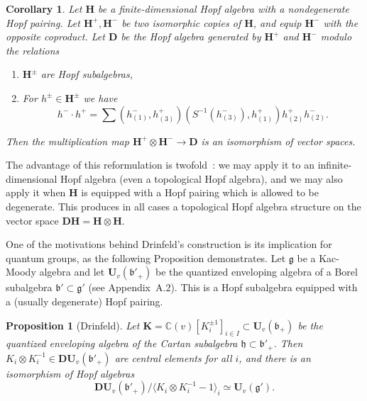 \documentclass[a4paper,10pt]{amsart}
\def\H{\mathbf{H}}
\def\U{\mathbf{U}}
\def\C{\mathbb{C}}
\def\g{\mathfrak{g}}
\def\bo{\mathfrak{b}}
\def\h{\mathfrak{h}}
\newtheorem{cor}[theo]{Corollary}
\newtheorem{prop}[theo]{Proposition}
\numberwithin{equation}{section}
\begin{document}
{\vspace{.1in}

\begin{cor}\label{C:Dridri} Let $\H$ be a finite-dimensional Hopf algebra with a nondegenerate Hopf pairing. Let $\H^+, \H^-$ be two isomorphic copies of $\H$, and equip $\H^-$ with the opposite coproduct. Let $\mathbf{D}$ be the Hopf algebra generated by $\H^+$ and $\H^-$ modulo the relations
\begin{enumerate}
\item[i)] $\H^{\pm}$ are Hopf subalgebras,
 \item[ii)] For $h^\pm \in \H^{\pm}$ we have
 $$h^- \cdot h^+=\sum  (h^-_{(1)},h^+_{(3)})(S^{-1}(h^-_{(3)}),h^+_{(1)})h^+_{(2)}h^-_{(2)}.$$
\end{enumerate}
Then the multiplication map $\H^+ \otimes \H^- \to \mathbf{D}$ is an isomorphism of vector spaces.
\end{cor}

\vspace{.1in}

The advantage of this reformulation is twofold~: we may apply it to an infinite-dimensional Hopf algebra (even a topological Hopf algebra), and we may also apply it when $\H$ is equipped with a Hopf pairing which is allowed to be degenerate. This produces in all cases a topological Hopf algebra structure on the vector space $\mathbf{D}\H=\H \otimes \H$.

\vspace{.15in}

One of the motivations behind Drinfeld's construction is its implication for quantum groups, as the following Proposition demonstrates. Let $\g$ be a Kac-Moody algebra and let $\U_v(\bo'_+)$ be the quantized enveloping algebra of a Borel subalgebra $\bo' \subset \g'$ (see Appendix~A.2). This is a Hopf subalgebra equipped with a (usually degenerate) Hopf pairing.

\vspace{.1in}

\begin{prop}[Drinfeld]  Let $\mathbf{K}=\C(v)[K_i^{\pm 1}]_{i \in I} \subset \U_v(\bo_+)$ be the quantized enveloping algebra of the Cartan subalgebra $\h \subset \bo'_+$.
Then $K_i \otimes K_i^{-1} \in \mathbf{D}\U_v(\bo'_+)$ are central elements for all $i$, and there is an isomorphism of Hopf algebras
$$\mathbf{D}\U_v(\bo'_+)/\langle K_i \otimes K_i^{-1} -1 \rangle_i \simeq \U_v(\g').$$
\end{prop}

}
\end{document}
